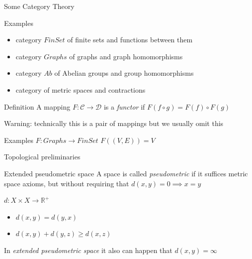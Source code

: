 \documentclass[unknownkeysallowed]{beamer}
\begin{document}
\begin{frame}{Some Category Theory}

	\begin{exampleblock}{Examples}
	\begin{itemize}
		\item category $FinSet$ of finite sets and functions between them
		\item category $Graphs$ of graphs and graph homomorphisms
		\item category $Ab$ of Abelian groups and group homomorphisms
		\item category of metric spaces and contractions
	\end{itemize}
	\end{exampleblock}

	\begin{block}{Definition}
	A mapping $F: \mathcal{C} \to \mathcal{D}$ is a \textit{functor} if $F(f \circ g) = F(f) \circ F(g)$

	Warning: technically this is a pair of mappings but we usually omit this
	\end{block}

	\begin{exampleblock}{Examples}
	$F: Graphs \to FinSet$ $F((V,E)) = V$
	\end{exampleblock}

\end{frame}

\begin{frame}{Topological preliminaries}

    \begin{block}{Extended pseudometric space}
    A space is called \textit{pseudometric} if it suffices metric space axioms, but without requiring that $d(x, y) = 0 \implies x = y$


    $d: X \times X \to \mathbb{R}^+$
    \begin{itemize}
        \item $d(x,y) = d(y, x)$
        \item $d(x, y) + d(y, z) \geq d(x, z)$

    \end{itemize}

    In  \textit{extended pseudometric space} it also can happen that $d(x, y) = \infty$

    \end{block}

\end{frame}
\end{document}
